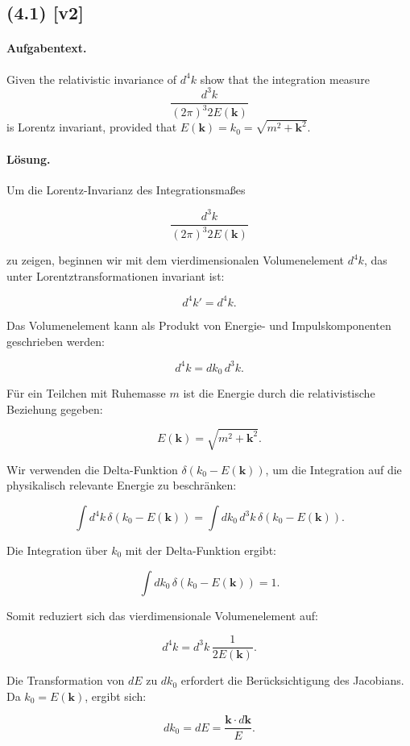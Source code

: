 \documentclass[11pt,a4paper]{article}
\begin{document}
\subsection*{(4.1) [v2]}
\paragraph{Aufgabentext.}
Given the relativistic invariance of $d^4 k$ show that the integration measure
$$
\frac{d^3 k}{(2 \pi)^3 2 E(\mathbf{k})}
$$
is Lorentz invariant, provided that $E(\mathbf{k})=k_0=\sqrt{m^2+\mathbf{k}^2}$.

\paragraph{Lösung.}
Um die Lorentz-Invarianz des Integrationsmaßes 

\[
\frac{d^3 k}{(2 \pi)^3 2 E(\mathbf{k})}
\]

zu zeigen, beginnen wir mit dem vierdimensionalen Volumenelement \(d^4 k\), das unter Lorentztransformationen invariant ist:

\[
d^4 k' = d^4 k.
\]

Das Volumenelement kann als Produkt von Energie- und Impulskomponenten geschrieben werden:

\[
d^4 k = dk_0 \, d^3 k.
\]

Für ein Teilchen mit Ruhemasse \(m\) ist die Energie durch die relativistische Beziehung gegeben:

\[
E(\mathbf{k}) = \sqrt{m^2 + \mathbf{k}^2}.
\]

Wir verwenden die Delta-Funktion \(\delta(k_0 - E(\mathbf{k}))\), um die Integration auf die physikalisch relevante Energie zu beschränken:

\[
\int d^4 k \, \delta(k_0 - E(\mathbf{k})) = \int dk_0 \, d^3 k \, \delta(k_0 - E(\mathbf{k})).
\]

Die Integration über \(k_0\) mit der Delta-Funktion ergibt:

\[
\int dk_0 \, \delta(k_0 - E(\mathbf{k})) = 1.
\]

Somit reduziert sich das vierdimensionale Volumenelement auf:

\[
d^4 k = d^3 k \, \frac{1}{2 E(\mathbf{k})}.
\]

Die Transformation von \(dE\) zu \(dk_0\) erfordert die Berücksichtigung des Jacobians. Da \(k_0 = E(\mathbf{k})\), ergibt sich:

\[
dk_0 = dE = \frac{\mathbf{k} \cdot d\mathbf{k}}{E}.
\]
\end{document}
